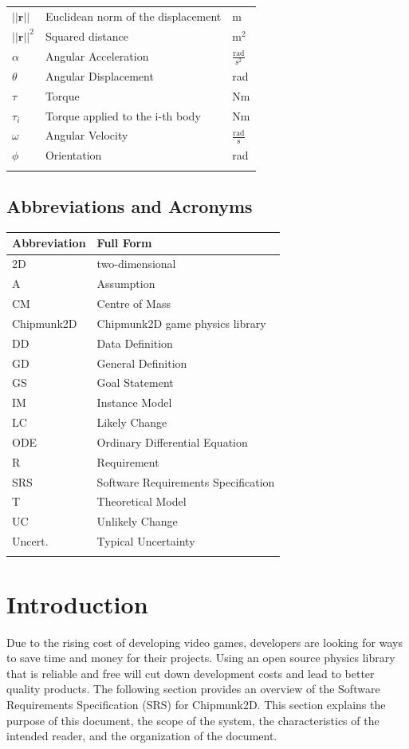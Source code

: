 \documentclass[12pt]{article}
\begin{document}
\begin{longtabu}{l X[l] l}
\\
$||\mathbf{r}||$ & Euclidean norm of the displacement & m
\\
${||\mathbf{r}||^{2}}$ & Squared distance & $\text{m}^{2}$
\\
$α$ & Angular Acceleration & $\frac{\text{rad}}{\text{s}^{2}}$
\\
$θ$ & Angular Displacement & rad
\\
$τ$ & Torque & Nm
\\
${τ_{i}}$ & Torque applied to the i-th body & Nm
\\
$ω$ & Angular Velocity & $\frac{\text{rad}}{\text{s}}$
\\
$ϕ$ & Orientation & rad
\\
\bottomrule
\label{Table:ToS}
\end{longtabu}
\subsection{Abbreviations and Acronyms}
\label{Sec:TAbbAcc}
\begin{longtable*}{l l}
\toprule
Abbreviation & Full Form
\\
\midrule
\endhead
2D & two-dimensional
\\
A & Assumption
\\
CM & Centre of Mass
\\
Chipmunk2D & Chipmunk2D game physics library
\\
DD & Data Definition
\\
GD & General Definition
\\
GS & Goal Statement
\\
IM & Instance Model
\\
LC & Likely Change
\\
ODE & Ordinary Differential Equation
\\
R & Requirement
\\
SRS & Software Requirements Specification
\\
T & Theoretical Model
\\
UC & Unlikely Change
\\
Uncert. & Typical Uncertainty
\\
\bottomrule
\label{Table:TAbbAcc}
\end{longtable*}
\section{Introduction}
\label{Sec:Intro}
Due to the rising cost of developing video games, developers are looking for ways to save time and money for their projects. Using an open source physics library that is reliable and free will cut down development costs and lead to better quality products.
The following section provides an overview of the Software Requirements Specification (SRS) for Chipmunk2D. This section explains the purpose of this document, the scope of the system, the characteristics of the intended reader, and the organization of the document.
\end{document}
